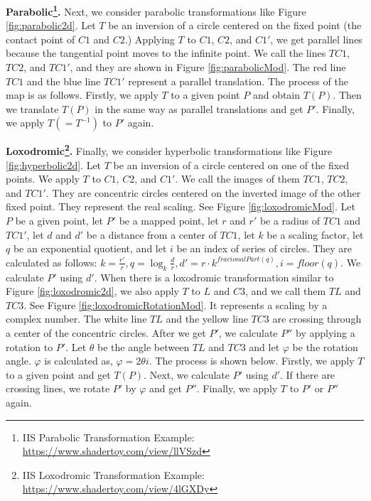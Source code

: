  \noindent\textbf{Parabolic\footnote{IIS Parabolic Transformation Example: \url{https://www.shadertoy.com/view/llVSzd}}.}
 Next, we consider parabolic transformations like Figure \ref{fig:parabolic2d}.
 Let $T$ be an inversion of a circle centered on the fixed point (the contact point of $C1$ and $C2$.)
 Applying $T$ to $C1$, $C2$, and $C1'$, we get parallel lines because
 the tangential point moves to the infinite point.
 We call the lines $TC1$, $TC2$, and $ TC1'$, and they are shown in
 Figure \ref{fig:parabolicMod}.
 The red line $TC1$ and the blue line $TC1'$ represent a parallel translation.
 The process of the map is as follows.
 Firstly, we apply $T$ to a given point $P$ and obtain $T(P)$.
 Then we translate $T(P)$ in the same way as parallel translations and get $P'$.
 Finally, we apply $T(= T^{-1}) $ to $P'$ again.

 \noindent\textbf{Loxodromic\footnote{IIS Loxodromic Transformation Example: \url{https://www.shadertoy.com/view/4lGXDy}}.}
 Finally, we consider hyperbolic
 transformations like Figure \ref{fig:hyperbolic2d}.
 Let $T$ be an inversion of a circle centered on one of the fixed
 points.
 We apply $T$ to $C1$, $C2$, and $C1'$.
 We call the images of them $TC1$, $TC2$, and $TC1'$.
 They are concentric circles centered on the inverted image
 of the other fixed point.
 They represent the real scaling.
 See Figure \ref{fig:loxodromicMod}.
 Let $P$ be a given point,
 let $P'$ be a mapped point,
 let $r$ and $r'$ be a radius of $TC1$ and $TC1'$,
 let $d$ and $d'$ be a distance from a center of $TC1$,
 let $k$ be a scaling factor,
 let $q$ be an exponential quotient, and let $i$ be an index of
 series of circles. They are calculated as follows:
 \begin{math}
  k = \frac{r'}{r},
  q = \log_{k} \frac{d}{r},
  d' = r \cdot k^{fracionalPart(q)},
  i = floor(q).
 \end{math}
 We calculate $P'$ using $d'$.
 When there is a loxodromic transformation similar to Figure \ref{fig:loxodromic2d},
 we also apply $T$ to $L$ and $C3$, and we call them $TL$ and $TC3$.
 See Figure \ref{fig:loxodromicRotationMod}.
 It represents a scaling by a complex number.
 The white line $TL$ and the yellow line $TC3$ are crossing
 through a center of the concentric circles.
 After we get $P'$, we calculate $P''$ by applying a rotation to $P'$.
 Let $\theta$ be the angle between $TL$ and $TC3$ and
 let $\varphi$ be the rotation angle.
 $\varphi$ is calculated as, $\varphi = 2 \theta i$.
 The process is shown below.
 Firstly, we apply $T$ to a given point and get $T(P)$.
 Next, we calculate $P'$ using $d'$.
 If there are crossing lines, we rotate $P'$ by $\varphi$ and get $P''$.
 Finally, we apply $T$ to $P'$ or $P''$ again.


